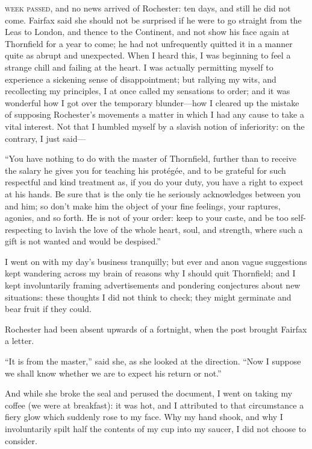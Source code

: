 
 \textsc{week passed,} and no news arrived of \Mr{} Rochester: ten days, and still
he did not come. \Mrs{} Fairfax said she should not be surprised if he
were to go straight from the Leas to London, and thence to the
Continent, and not show his face again at Thornfield for a year to come;
he had not unfrequently quitted it in a manner quite as abrupt and
unexpected. When I heard this, I was beginning to feel a strange chill
and failing at the heart. I was actually permitting myself to
experience a sickening sense of disappointment; but rallying my wits,
and recollecting my principles, I at once called my sensations to order;
and it was wonderful how I got over the temporary blunder---how I
cleared up the mistake of supposing \Mr{} Rochester's movements a matter
in which I had any cause to take a vital interest. Not that I humbled
myself by a slavish notion of inferiority: on the contrary, I just
said---

\enquote{You have nothing to do with the master of Thornfield, further
	than to receive the salary he gives you for teaching his protégée, and
	to be grateful for such respectful and kind treatment as, if you do your
	duty, you have a right to expect at his hands. Be sure that is the only
	tie he seriously acknowledges between you and him; so don't make him the
	object of your fine feelings, your raptures, agonies, and so forth. He
	is not of your order: keep to your caste, and be too self-respecting to
	lavish the love of the whole heart, soul, and strength, where such a
	gift is not wanted and would be despised.}

I went on with my day's business tranquilly; but ever and anon vague
suggestions kept wandering across my brain of reasons why I should quit
Thornfield; and I kept involuntarily framing advertisements and
pondering conjectures about new situations: these thoughts I did not
think to check; they might germinate and bear fruit if they could.

\Mr{} Rochester had been absent upwards of a fortnight, when the post
brought \Mrs{} Fairfax a letter.

\enquote{It is from the master,} said she, as she looked at the
direction. \enquote{Now I suppose we shall know whether we are to
	expect his return or not.}

And while she broke the seal and perused the document, I went on taking
my coffee (we were at breakfast): it was hot, and I attributed to that
circumstance a fiery glow which suddenly rose to my face. Why my hand
shook, and why I involuntarily spilt half the contents of my cup into my
saucer, I did not choose to consider.

